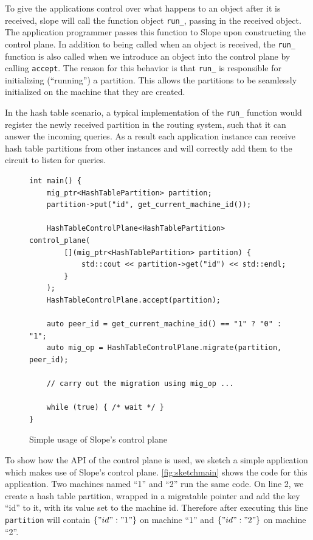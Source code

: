 To give the applications control over what happens to an object after it is
received, slope will call the function object \texttt{run\_}, passing in the
received object. The application programmer passes this function to Slope upon
constructing the control plane. In addition to being called when an object is
received, the \texttt{run\_} function is also called when we introduce an object
into the control plane by calling \texttt{accept}. The reason for this behavior
is that \texttt{run\_} is responsible for initializing (``running'') a partition.
This allows the partitions to be seamlessly initialized on the machine that they
are created.


In the hash table scenario, a typical
implementation of the \texttt{run\_} function would register the newly received
partition in the routing system, such that it can answer the incoming queries.
As a result each application instance can receive hash table partitions from
other instances and will correctly add them to the circuit to listen for queries.


\begin{figure}[tp]
\begin{lstlisting}
int main() {
    mig_ptr<HashTablePartition> partition;
    partition->put("id", get_current_machine_id());

    HashTableControlPlane<HashTablePartition> control_plane(
        [](mig_ptr<HashTablePartition> partition) {
            std::cout << partition->get("id") << std::endl;
        }
    );
    HashTableControlPlane.accept(partition);

    auto peer_id = get_current_machine_id() == "1" ? "0" : "1";
    auto mig_op = HashTableControlPlane.migrate(partition, peer_id);

    // carry out the migration using mig_op ...

    while (true) { /* wait */ }
}
\end{lstlisting}
\caption{
    Simple usage of Slope's control plane
}
\label{fig:sketchmain}
\end{figure}

To show how the API of the control plane is used, we sketch a simple application
which makes use of Slope's control plane.
\autoref{fig:sketchmain} shows the code for this application. Two machines
named ``1'' and ``2'' run the same code. On line 2, we create a hash table
partition, wrapped in a migratable pointer and add the key ``id'' to it, with its
value set to the machine id. Therefore after executing this line
\texttt{partition} will contain $\{"id": "1"\}$
on machine ``1'' and $\{"id": "2"\}$ on machine ``2''.

